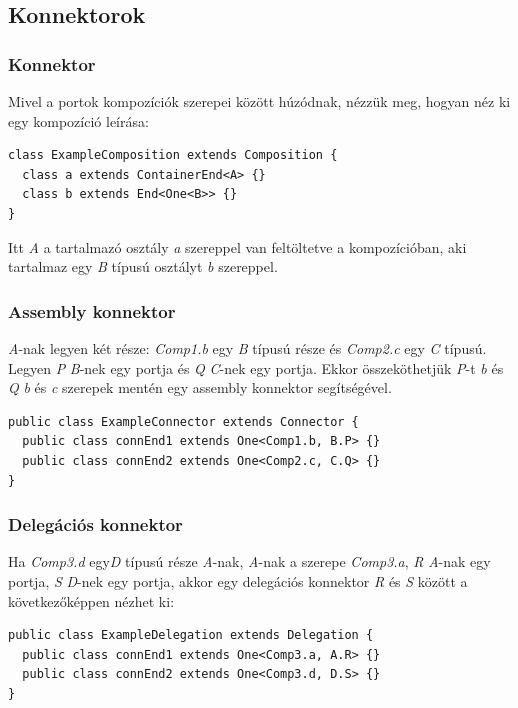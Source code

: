 \documentclass[a4paper,12pt]{report}
\begin{document}
\subsection{Konnektorok}
\subsubsection{Konnektor} 
Mivel a portok kompozíciók szerepei között húzódnak, nézzük meg, hogyan néz ki egy kompozíció leírása:
\begin{lstlisting}
class ExampleComposition extends Composition {
  class a extends ContainerEnd<A> {}
  class b extends End<One<B>> {}
}
\end{lstlisting}
Itt \textit{A} a tartalmazó osztály \textit{a} szereppel van feltöltetve a kompozícióban, aki tartalmaz egy \textit{B} típusú osztályt \textit{b} szereppel.

\subsubsection{Assembly konnektor}

\textit{A}-nak legyen két része: \textit{Comp1.b} egy \textit{B} típusú része és \textit{Comp2.c} egy \textit{C} típusú. Legyen \textit{P} \textit{B}-nek egy portja és \textit{Q} \textit{C}-nek egy portja. Ekkor összeköthetjük \textit{P}-t \textit{b} és \textit{Q} \textit{b} és \textit{c} szerepek mentén egy assembly konnektor segítségével. 

\begin{lstlisting}
public class ExampleConnector extends Connector {
  public class connEnd1 extends One<Comp1.b, B.P> {}
  public class connEnd2 extends One<Comp2.c, C.Q> {}
}
\end{lstlisting}

\subsubsection{Delegációs konnektor}
Ha \textit{Comp3.d} egy\textit{D} típusú része \textit{A}-nak, \textit{A}-nak a szerepe \textit{Comp3.a}, \textit{R} \textit{A}-nak egy portja, \textit{S} \textit{D}-nek egy portja, akkor egy delegációs konnektor \textit{R} és \textit{S} között a következőképpen nézhet ki:
\begin{lstlisting}
public class ExampleDelegation extends Delegation {
  public class connEnd1 extends One<Comp3.a, A.R> {}
  public class connEnd2 extends One<Comp3.d, D.S> {}
}
\end{lstlisting}
\end{document}
